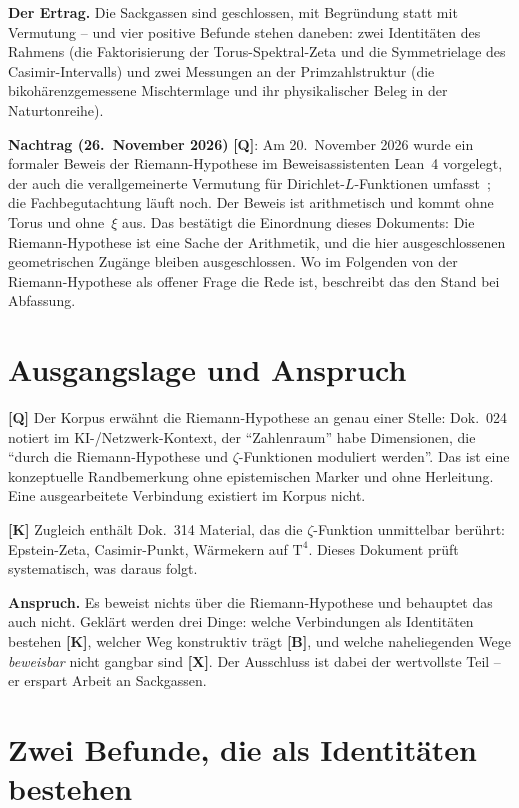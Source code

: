\textbf{Der Ertrag.} Die Sackgassen sind geschlossen, mit Begr\"undung
statt mit Vermutung -- und vier positive Befunde stehen daneben: zwei
Identit\"aten des Rahmens (die Faktorisierung der Torus-Spektral-Zeta
und die Symmetrielage des Casimir-Intervalls) und zwei Messungen an der
Primzahlstruktur (die bikoh\"arenzgemessene Mischtermlage und ihr
physikalischer Beleg in der Naturtonreihe).

\noindent\textbf{Nachtrag (26.~November 2026)} \textbf{[Q]}: Am 20.~November 2026
wurde ein formaler Beweis der Riemann-Hypothese im Beweisassistenten Lean~4
vorgelegt, der auch die verallgemeinerte Vermutung für Dirichlet-$L$-Funktionen
umfasst~\cite{alpoege2026}; die Fachbegutachtung läuft noch. Der Beweis ist
arithmetisch und kommt ohne Torus und ohne~$\xi$ aus. Das bestätigt die
Einordnung dieses Dokuments: Die Riemann-Hypothese ist eine Sache der
Arithmetik, und die hier ausgeschlossenen geometrischen Zugänge bleiben
ausgeschlossen. Wo im Folgenden von der Riemann-Hypothese als offener Frage die
Rede ist, beschreibt das den Stand bei Abfassung.

\section{Ausgangslage und Anspruch}

\textbf{[Q]} Der Korpus erw\"ahnt die Riemann-Hypothese an genau einer
Stelle: Dok.~024 notiert im KI-/Netzwerk-Kontext, der
\enquote{Zahlenraum} habe Dimensionen, die \enquote{durch die
Riemann-Hypothese und $\zeta$-Funktionen moduliert werden}. Das ist eine
konzeptuelle Randbemerkung ohne epistemischen Marker und ohne
Herleitung. Eine ausgearbeitete Verbindung existiert im Korpus nicht.

\textbf{[K]} Zugleich enth\"alt Dok.~314 Material, das die
$\zeta$-Funktion unmittelbar ber\"uhrt: Epstein-Zeta, Casimir-Punkt,
W\"armekern auf $\text{T}^4$. Dieses Dokument pr\"uft systematisch, was
daraus folgt.

\textbf{Anspruch.} Es beweist nichts \"uber die Riemann-Hypothese und
behauptet das auch nicht. Gekl\"art werden drei Dinge: welche
Verbindungen als Identit\"aten bestehen \textbf{[K]}, welcher Weg
konstruktiv tr\"agt \textbf{[B]}, und welche naheliegenden Wege
\emph{beweisbar} nicht gangbar sind \textbf{[X]}. Der Ausschluss ist
dabei der wertvollste Teil -- er erspart Arbeit an Sackgassen.

\section{Zwei Befunde, die als Identit\"aten bestehen}
\label{sec:faktor}


